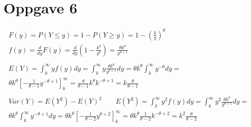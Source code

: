 \section*{Oppgave 6}


\begin{gather*}
	F(y) = P(Y \leq y) = 1 - P(Y \geq y) = 1 - \left(\frac{k}{y}\right)^\theta
	\\
	f(y) = \frac{d}{dy} F(y) = \frac{d}{dy} \left(
		1 - \frac{k^\theta}{y^\theta}
	\right)
	=
	\frac{\theta k^\theta}{y^{\theta + 1}}
	\\
	\\
	E(Y) = \int_{k}^\infty{y f(y) dy}
	=
	\int_{k}^\infty{y\frac{\theta k^\theta}{y^{\theta + 1}} dy}
	=
	\theta k^\theta \int_{k}^\infty{y^{-\theta} dy}
	=
	\\
	\theta k^\theta \left[- \frac{1}{\theta - 1} y^{-\theta + 1} \right]_k^\infty
	=
	\frac{\theta}{\theta - 1} k^\theta k^{-\theta + 1} =
	k \frac{\theta}{\theta - 1}
	\\
	\\
	Var(Y) = E(Y^2) - E(Y)^2 \qquad
	E(Y^2)
	=
	\int_{k}^\infty{y^2 f(y) dy}
	=
	\int_{k}^\infty{y^2 \frac{\theta k^\theta}{y^{\theta + 1}} dy} =
	\\
	\theta k^\theta \int_{k}^\infty{y^{-\theta + 1} dy}
	=
	\theta k^\theta \left[- \frac{1}{\theta - 2} y^{\theta + 2} \right]_k^\infty
	=
	\theta k^\theta \frac{1}{\theta - 2} k^{-\theta + 2}
	=
	k^2 \frac{\theta}{\theta - 2}
\end{gather*}

